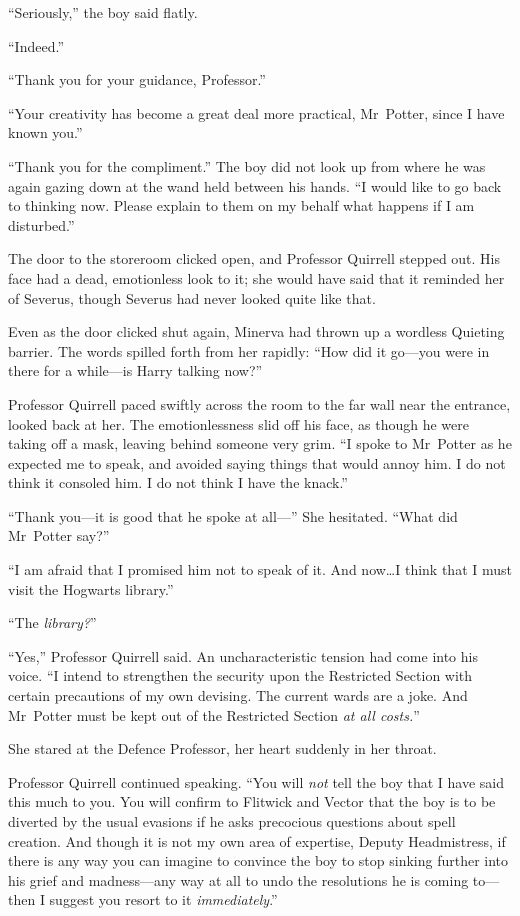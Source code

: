 “Seriously,” the boy said flatly.

“Indeed.”

“Thank you for your guidance, Professor.”

“Your creativity has become a great deal more practical, Mr~Potter, since I have known you.”

“Thank you for the compliment.” The boy did not look up from where he was again gazing down at the wand held between his hands. “I would like to go back to thinking now. Please explain to them on my behalf what happens if I am disturbed.”

\later

The door to the storeroom clicked open, and Professor Quirrell stepped out. His face had a dead, emotionless look to it; she would have said that it reminded her of Severus, though Severus had never looked quite like that.

Even as the door clicked shut again, Minerva had thrown up a wordless Quieting barrier. The words spilled forth from her rapidly: “How did it go—you were in there for a while—is Harry talking now?”

Professor Quirrell paced swiftly across the room to the far wall near the entrance, looked back at her. The emotionlessness slid off his face, as though he were taking off a mask, leaving behind someone very grim. “I spoke to Mr~Potter as he expected me to speak, and avoided saying things that would annoy him. I do not think it consoled him. I do not think I have the knack.”

“Thank you—it is good that he spoke at all—” She hesitated. “What did Mr~Potter say?”

“I am afraid that I promised him not to speak of it. And now…I think that I must visit the Hogwarts library.”

“The \emph{library?}”

“Yes,” Professor Quirrell said. An uncharacteristic tension had come into his voice. “I intend to strengthen the security upon the Restricted Section with certain precautions of my own devising. The current wards are a joke. And Mr~Potter must be kept out of the Restricted Section \emph{at all costs.}”

She stared at the Defence Professor, her heart suddenly in her throat.

Professor Quirrell continued speaking. “You will \emph{not} tell the boy that I have said this much to you. You will confirm to Flitwick and Vector that the boy is to be diverted by the usual evasions if he asks precocious questions about spell creation. And though it is not my own area of expertise, Deputy Headmistress, if there is any way you can imagine to convince the boy to stop sinking further into his grief and madness—any way at all to undo the resolutions he is coming to—then I suggest you resort to it \emph{immediately}.”
